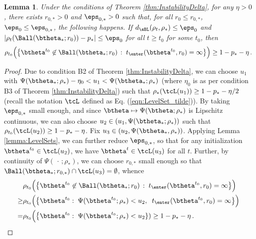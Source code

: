 \documentclass[11pt]{article}
\newtheorem{lemma}{Lemma}
\begin{document}
%
\begin{lemma}\label{lemma:Enter}
Under the conditions of Theorem \ref{thm:InstabilityDelta}, for any $\eta >0$, there exists $r_{0,*}>0$ and $\eps_{0,*}>0$ such that, for all $r_0\le r_{0,*}$, $\eps_0\le \eps_{0,*}$, the following happens. 
If $d_{\sBL}(\rho_t,\rho_*)\le \eps_0$ and $|\rho_t(\Ball(\btheta_*;r_0))-p_*|\le \eps_0$  for all $t \ge t_0$ for some $t_0$, then
%
\begin{align}
%
\rho_{t_0}\Big(\big\{\btheta^{t_0} \not\in \Ball(\btheta_*;r_0)\, :\; t_{\enter}(\btheta^{t_0},r_0) =\infty\big\}\Big)\ge 1-p_*-\eta \, .
\label{eq:ExitClaim2}
%
\end{align}
\end{lemma}
%
\begin{proof}
Due to condition {\sf B2} of Theorem \ref{thm:InstabilityDelta}, we can choose $u_1$ with $\Psi(\btheta_*; \rho_*) - \eta_0 < u_1<\Psi(\btheta_*;\rho_*)$ (where $\eta_0$ is as per condition {\sf B3} of Theorem \ref{thm:InstabilityDelta}) such that $\rho_*(\tcL(u_1))\ge 1-p_*-\eta /2$ (recall the notation $\tcL$ defined as Eq. (\ref{eqn:LevelSet_tilde})). By taking $\eps_{0,*}$ small enough,
and since $\btheta\mapsto \Psi(\btheta;\rho_*)$ is Lipschitz continuous, we can also choose $u_2\in (u_1,\Psi(\btheta_*;\rho_*))$ such that
$\rho_{t_0}(\tcL(u_2)) \ge 1-p_*-\eta $. Fix $u_3\in (u_2,\Psi(\btheta_*,\rho_*))$. Applying Lemma \ref{lemma:LevelSets}, we can further reduce $\eps_{0,*}$,
so that for any initialization  $\btheta^{t_0}\in\tcL(u_2)$, we have $\btheta^t\in\tcL(u_3)$ for all $t$. 
Further, by continuity of $\Psi(\,\cdot\,;\rho_*)$, we can choose $r_{0,*}$ small enough so that $\Ball(\btheta_*;r_{0,*})\cap \tcL(u_3) = \emptyset$, whence
%
\begin{align}
%
&\rho_{t_0}\Big(\big\{\btheta^{t_0}\not\in \Ball(\btheta_*;r_0)\, :\; t_{\enter}(\btheta^{t_0},r_0)=\infty\big\}\Big)\\
\ge& \rho_{t_0}\Big(\big\{\btheta^{t_0}:\; \Psi(\btheta^{t_0};\rho_*)<u_2,\;\; 
 t_{\enter}(\btheta^{t_0},r_0) =\infty\big\}\Big)\\
=&  \rho_{t_0}\Big(\big\{\btheta^{t_0}:\; \Psi(\btheta^{t_0};\rho_*)<u_2\}) \ge 1-p_*-\eta \, .
\label{eq:ExitClaim2}
%
\end{align}
\end{proof}
\end{document}
